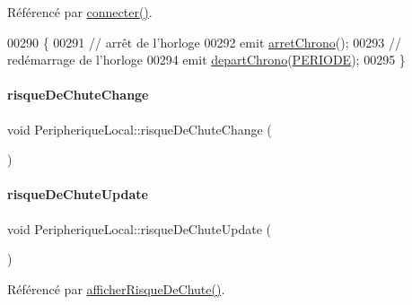 Référencé par \hyperlink{class_peripherique_local_af2e7f023f8ed72ebc1d36e66c440ceca}{connecter()}.


\begin{DoxyCode}
00290 \{
00291     \textcolor{comment}{// arrêt de l'horloge}
00292     emit \hyperlink{class_peripherique_local_a150599c1ded2462eb0e2d1d943459a34}{arretChrono}();
00293      \textcolor{comment}{// redémarrage de l'horloge}
00294     emit \hyperlink{class_peripherique_local_a8c29d255e41df4bc381f4ff2d1451416}{departChrono}(\hyperlink{chronometreutilisation_8h_ad0750d12e2f5f404ec458d4066a53fa4}{PERIODE});
00295 \}
\end{DoxyCode}
\mbox{\label{class_peripherique_local_adfe5bde79cfe1f585dbbdf21269ebe2b}} 
\paragraph{\texorpdfstring{risque\+De\+Chute\+Change}{risqueDeChuteChange}}
{\footnotesize\ttfamily void Peripherique\+Local\+::risque\+De\+Chute\+Change (\begin{DoxyParamCaption}{ }\end{DoxyParamCaption})\hspace{0.3cm}{\ttfamily [signal]}}

\mbox{\label{class_peripherique_local_a4c2e32ed7feda45c6347144a99be7525}} 
\paragraph{\texorpdfstring{risque\+De\+Chute\+Update}{risqueDeChuteUpdate}}
{\footnotesize\ttfamily void Peripherique\+Local\+::risque\+De\+Chute\+Update (\begin{DoxyParamCaption}{ }\end{DoxyParamCaption})\hspace{0.3cm}{\ttfamily [signal]}}



Référencé par \hyperlink{class_peripherique_local_ac20ba20d69997e441b1b782f8b506291}{afficher\+Risque\+De\+Chute()}.

